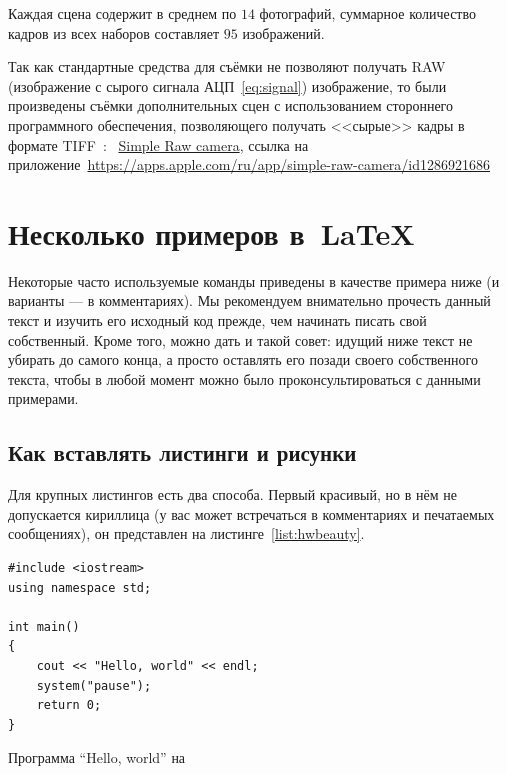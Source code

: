 Каждая сцена содержит в среднем по $14$ фотографий, суммарное количество кадров из всех наборов составляет $95$ изображений.


Так как стандартные средства для съёмки не позволяют получать RAW (изображение с сырого сигнала АЦП~\ref{eq:signal}) изображение, то были произведены съёмки дополнительных сцен с использованием стороннего программного обеспечения, позволяющего получать <<сырые>>  кадры в формате TIFF~\autocite{TIFFArticle}: ~\href{https://apps.apple.com/ru/app/simple-raw-camera/id1286921686}{Simple Raw camera}, ссылка на приложение~\url{https://apps.apple.com/ru/app/simple-raw-camera/id1286921686}


\section{Несколько примеров в~\LaTeX{}}
\label{sec:examples}

Некоторые часто используемые
команды приведены в качестве примера ниже (и варианты — в
комментариях). Мы рекомендуем внимательно прочесть данный
текст и изучить его исходный код прежде, чем начинать писать
свой собственный. Кроме того, можно дать и такой совет: идущий
ниже текст не убирать до самого конца, а просто оставлять его
позади своего собственного текста, чтобы в любой момент можно
было проконсультироваться с данными примерами.

\subsection{Как вставлять листинги и рисунки}

Для крупных листингов есть два способа. Первый красивый, но в нём не допускается
кириллица (у вас может встречаться в комментариях и
печатаемых сообщениях), он представлен на листинге~\ref{list:hwbeauty}.
\begin{ListingEnv}[H]%
\begin{lstlisting}
#include <iostream>
using namespace std;

int main()
{
    cout << "Hello, world" << endl;
    system("pause");
    return 0;
}
\end{lstlisting}
\caption{Программа “Hello, world” на \protect\cpp}
\label{list:hwbeauty}
\end{ListingEnv}

